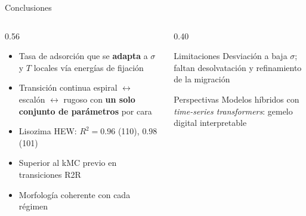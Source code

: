 \documentclass[aspectratio=169,11pt]{beamer}
\begin{document}
\begin{frame}{Conclusiones}
  \begin{columns}[T,onlytextwidth]
    \begin{column}{0.56\textwidth}
      \begin{itemize}\setlength{\itemsep}{0.7em}
        \item Tasa de adsorción que se \textbf{adapta} a $\sigma$ y $T$ locales vía energías de fijación
        \item Transición continua espiral $\leftrightarrow$ escalón $\leftrightarrow$ rugoso con \textbf{un solo conjunto de parámetros} por cara
        \item Lisozima HEW: $R^2 = 0.96$ (110), $0.98$ (101)
        \item Superior al kMC previo en transiciones R2R
        \item Morfología coherente con cada régimen
      \end{itemize}
    \end{column}
    \begin{column}{0.40\textwidth}
      \begin{block}{Limitaciones}
        \small
        Desviación a baja $\sigma$; faltan desolvatación y refinamiento de la migración
      \end{block}
      \vspace{0.4em}
      \begin{block}{Perspectivas}
        \small
        Modelos híbridos con \emph{time-series transformers}: gemelo digital interpretable
      \end{block}
    \end{column}
  \end{columns}
\end{frame}
\end{document}

